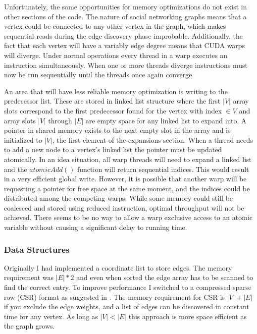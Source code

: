 \documentclass[10pt,twocolumn]{article}
\begin{document}
Unfortunately, the same opportunities for memory optimizations do not exist in other sections of the code. The nature of social networking graphs means that a vertex could be connected to any other vertex in the graph, which makes sequential reads during the edge discovery phase improbable. Additionally, the fact that each vertex will have a variably edge degree means that CUDA warps will diverge. Under normal operations every thread in a warp executes an instruction simultaneously. When one or more threads diverge instructions must now be run sequentially until the threads once again converge.
 
An area that will have less reliable memory optimization is writing to the predecessor list. These are stored in linked list structure where the first $|V|$ array slots correspond to the first predecessor found for the vertex with index $ \in V$ and array slots $|V|$ through $|E|$ are empty space for any linked list to expand into. A pointer in shared memory exists to the next empty slot in the array and is initialized to $|V|$, the first element of the expansions section. When a thread needs to add a new node to a vertex's linked list the pointer must be updated atomically. In an idea situation, all warp threads will need to expand a linked list and the $atomicAdd()$ function will return sequential indices. This would result in a very efficient global write. However, it is possible that another warp will be requesting a pointer for free space at the same moment, and the indices could be distributed among the competing warps. While some memory could still be coalesced and stored using reduced instruction, optimal throughput will not be achieved. There seems to be no way to allow a warp exclusive access to an atomic variable without causing a significant delay to running time.

\subsubsection{Data Structures}
Originally I had implemented a coordinate list to store edges. The memory requirement was $|E| * 2$ and even when sorted the edge array has to be scanned to find the correct entry. To improve performance I switched to a compressed sparse row (CSR) format as suggested in \cite{Sariyuce}. The memory requirement for CSR is $|V| + |E|$ if you exclude the edge weights, and a list of edges can be discovered in constant time for any vertex. As long as $|V| < |E|$ this approach is more space efficient as the graph grows.
\end{document}
